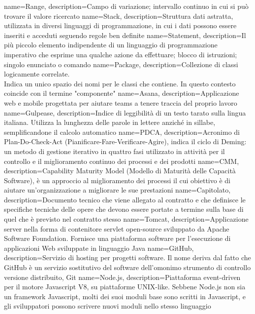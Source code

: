  {
	name=Range,
	description={Campo di variazione; intervallo continuo in cui si può trovare il valore ricercato}
}
 {
	name=Stack,
	description={Struttura dati astratta, utilizzata in diversi linguaggi di programmazione, in cui i dati possono essere inseriti e acceduti seguendo regole ben definite}
}
 {
	name=Statement,
	description={Il più piccolo elemento indipendente di un linguaggio di programmazione imperativo che esprime una qualche azione da effettuare; blocco di istruzioni;
	singolo enunciato o comando}
}
 {
	name=Package,
	description={Collezione di classi logicamente correlate.\\
	Indica un unico spazio dei nomi per le classi che contiene. In questo contesto coincide con il termine "componente"}
}
 {
	name=Asana,
	description={Applicazione web e mobile progettata per aiutare teams a tenere traccia del proprio lavoro}
}
 {
	name=Gulpease,
	description={Indice di leggibilità di un testo tarato sulla lingua italiana. Utilizza la	lunghezza delle parole in lettere anziché in sillabe, semplificandone il calcolo automatico}
}
 {
	name=PDCA,
	description={Acronimo di Plan-Do-Check-Act (Pianificare-Fare-Verificare-Agire), indica il ciclo di Deming: un metodo di gestione iterativo in quattro fasi utilizzato in attività per
	il controllo e il miglioramento continuo dei processi e	dei prodotti}
}
 {
	name=CMM,
	description={Capability Maturity Model (Modello di Maturità delle Capacità Software), è
	un approccio al miglioramento dei processi il cui obiettivo è di aiutare un'organizzazione a
	migliorare le sue prestazioni}
}
 {
	name=Capitolato,
	description={Documento tecnico che viene allegato al contratto e che definisce le specifiche
	tecniche delle opere che devono essere portate a termine sulla base di quel che è previsto
	nel contratto stesso}
}
 {
	name=Tomcat,
	description={Applicazione server nella forma di contenitore servlet open-source sviluppato
	da Apache Software Foundation. Fornisce una piattaforma software per l'esecuzione di
	applicazioni Web sviluppate in linguaggio Java}
}
 {
	name=GitHub,
	description={Servizio di hosting per progetti software. Il nome deriva dal fatto che GitHub è
	un servizio sostitutivo del software dell'omonimo strumento di controllo
	versione distribuito, Git}
}
 {
	name=Node.js,
	description={Piattaforma event-driven per il motore Javascript V8, su piattaforme UNIX-like.
	Sebbene Node.js non sia un framework Javascript, molti dei suoi moduli base sono scritti in
	Javascript, e gli sviluppatori possono scrivere nuovi moduli nello stesso linguaggio}
}
